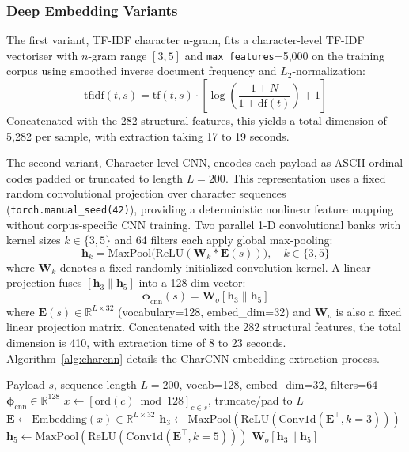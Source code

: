 \documentclass[11pt,a4paper]{article}
\begin{document}
\subsubsection{Deep Embedding Variants}

The first variant, TF-IDF character n-gram, fits a character-level TF-IDF vectoriser with $n$-gram range $[3,5]$ and \texttt{max\_features}=5,000 on the training corpus using smoothed inverse document frequency and $L_2$-normalization:
\begin{equation}
  \text{tfidf}(t,s) = \text{tf}(t,s) \cdot \left[ \log\left( \frac{1+N}{1+\text{df}(t)} \right) + 1 \right]
  \label{eq:tfidf}
\end{equation}
Concatenated with the 282 structural features, this yields a total dimension of 5,282 per sample, with extraction taking 17 to 19 seconds.

The second variant, Character-level CNN, encodes each payload as ASCII ordinal codes padded or truncated to length $L{=}200$. This representation uses a fixed random convolutional projection over character sequences (\texttt{torch.manual\_seed(42)}), providing a deterministic nonlinear feature mapping without corpus-specific CNN training. Two parallel 1-D convolutional banks with kernel sizes $k\in\{3,5\}$ and 64 filters each apply global max-pooling:
\begin{equation}
  \mathbf{h}_k = \text{MaxPool}\bigl(\text{ReLU}(\mathbf{W}_k \ast \mathbf{E}(s))\bigr),
  \quad k \in \{3,5\}
  \label{eq:charcnn_conv}
\end{equation}
where $\mathbf{W}_k$ denotes a fixed randomly initialized convolution kernel. A linear projection fuses $[\mathbf{h}_3 \| \mathbf{h}_5]$ into a 128-dim vector:
\begin{equation}
  \boldsymbol{\phi}_{\text{cnn}}(s) = \mathbf{W}_o [\mathbf{h}_3 \| \mathbf{h}_5]
  \label{eq:charcnn_proj}
\end{equation}
where $\mathbf{E}(s) \in \mathbb{R}^{L \times 32}$ (vocabulary=128, embed\_dim=32) and $\mathbf{W}_o$ is also a fixed linear projection matrix. Concatenated with the 282 structural features, the total dimension is 410, with extraction time of 8 to 23 seconds. Algorithm~\ref{alg:charcnn} details the CharCNN embedding extraction process.

\begin{algorithm}[ht]
\caption{CharCNN Embedding}
\label{alg:charcnn}
\begin{algorithmic}[1]
\REQUIRE Payload $s$, sequence length $L{=}200$, vocab=128, embed\_dim=32, filters=64
\ENSURE $\boldsymbol{\phi}_{\text{cnn}} \in \mathbb{R}^{128}$
\STATE $x \leftarrow [\text{ord}(c) \bmod 128]_{c \in s}$, truncate/pad to $L$
\STATE $\mathbf{E} \leftarrow \text{Embedding}(x) \in \mathbb{R}^{L \times 32}$
\STATE $\mathbf{h}_3 \leftarrow \text{MaxPool}(\text{ReLU}(\text{Conv1d}(\mathbf{E}^\top, k{=}3)))$
\STATE $\mathbf{h}_5 \leftarrow \text{MaxPool}(\text{ReLU}(\text{Conv1d}(\mathbf{E}^\top, k{=}5)))$
\RETURN $\mathbf{W}_o [\mathbf{h}_3 \| \mathbf{h}_5]$
\end{algorithmic}
\end{algorithm}
\end{document}
